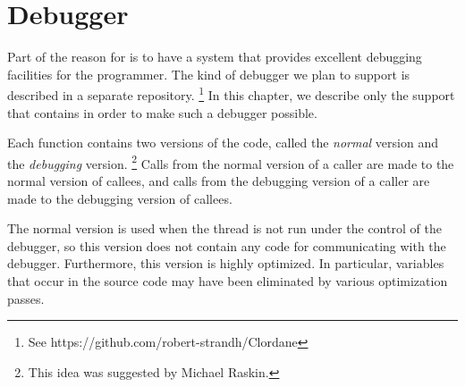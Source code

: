 \chapter{Debugger}
\label{chap-debugger}

Part of the reason for \sysname{} is to have a system that provides
excellent debugging facilities for the programmer.  The kind of
debugger we plan to support is described in a separate repository.%
\footnote{See https://github.com/robert-strandh/Clordane}  In this
chapter, we describe only the support that \sysname{} contains in
order to make such a debugger possible.

Each function contains two versions of the code, called the
\emph{normal} version and the \emph{debugging} version.%
\footnote{This idea was suggested by Michael Raskin.}
Calls from the normal version of a caller are made to the normal version
of callees, and calls from the debugging version of a caller are made to
the debugging version of callees.

The normal version is used when the thread is not run under the
control of the debugger, so this version does not contain any code for
communicating with the debugger.  Furthermore, this version is highly
optimized.  In particular, variables that occur in the source code may
have been eliminated by various optimization passes.


